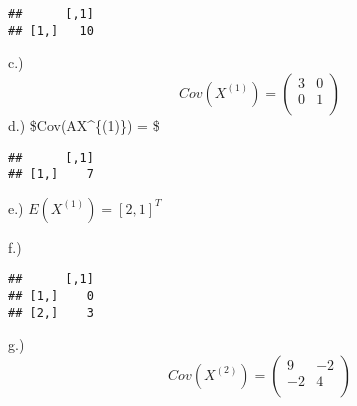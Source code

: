 \documentclass[
]{article}
\newenvironment{Shaded}{\begin{snugshade}}{\end{snugshade}}
\newcommand{\DataTypeTok}[1]{\textcolor[rgb]{0.13,0.29,0.53}{#1}}
\newcommand{\DecValTok}[1]{\textcolor[rgb]{0.00,0.00,0.81}{#1}}
\newcommand{\KeywordTok}[1]{\textcolor[rgb]{0.13,0.29,0.53}{\textbf{#1}}}
\newcommand{\NormalTok}[1]{#1}
\newcommand{\OperatorTok}[1]{\textcolor[rgb]{0.81,0.36,0.00}{\textbf{#1}}}
\newcommand{\StringTok}[1]{\textcolor[rgb]{0.31,0.60,0.02}{#1}}
\begin{document}
\begin{verbatim}
##      [,1]
## [1,]   10
\end{verbatim}

c.) \[ 
Cov(X^{(1)}) = \begin{pmatrix}
3  & 0\\
0 & 1 \\
\end{pmatrix} 
\] d.) \$Cov(AX\^{}\{(1)\}) = \$

\begin{Shaded}
\end{Shaded}

\begin{verbatim}
##      [,1]
## [1,]    7
\end{verbatim}

e.) \(E(X^{(1)}) = [2,1]^T\)

f.)

\begin{Shaded}
\end{Shaded}

\begin{verbatim}
##      [,1]
## [1,]    0
## [2,]    3
\end{verbatim}

g.) \[ Cov(X^{(2)}) = \begin{pmatrix}
9  & -2\\
-2 & 4 \\
\end{pmatrix} 
\]
\end{document}
